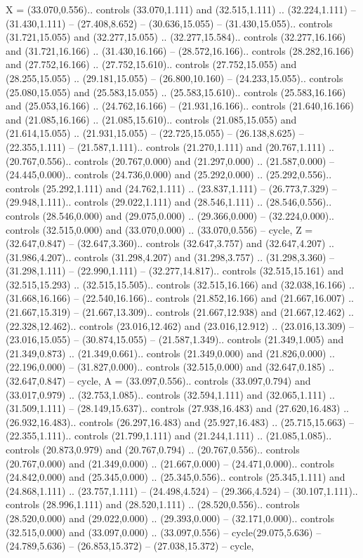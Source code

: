 {X} = {(33.070,0.556).. controls (33.070,1.111) and (32.515,1.111) .. (32.224,1.111) -- (31.430,1.111) -- (27.408,8.652) -- (30.636,15.055) -- (31.430,15.055).. controls (31.721,15.055) and (32.277,15.055) .. (32.277,15.584).. controls (32.277,16.166) and (31.721,16.166) .. (31.430,16.166) -- (28.572,16.166).. controls (28.282,16.166) and (27.752,16.166) .. (27.752,15.610).. controls (27.752,15.055) and (28.255,15.055) .. (29.181,15.055) -- (26.800,10.160) -- (24.233,15.055).. controls (25.080,15.055) and (25.583,15.055) .. (25.583,15.610).. controls (25.583,16.166) and (25.053,16.166) .. (24.762,16.166) -- (21.931,16.166).. controls (21.640,16.166) and (21.085,16.166) .. (21.085,15.610).. controls (21.085,15.055) and (21.614,15.055) .. (21.931,15.055) -- (22.725,15.055) -- (26.138,8.625) -- (22.355,1.111) -- (21.587,1.111).. controls (21.270,1.111) and (20.767,1.111) .. (20.767,0.556).. controls (20.767,0.000) and (21.297,0.000) .. (21.587,0.000) -- (24.445,0.000).. controls (24.736,0.000) and (25.292,0.000) .. (25.292,0.556).. controls (25.292,1.111) and (24.762,1.111) .. (23.837,1.111) -- (26.773,7.329) -- (29.948,1.111).. controls (29.022,1.111) and (28.546,1.111) .. (28.546,0.556).. controls (28.546,0.000) and (29.075,0.000) .. (29.366,0.000) -- (32.224,0.000).. controls (32.515,0.000) and (33.070,0.000) .. (33.070,0.556) -- cycle},
{Z} = {(32.647,0.847) -- (32.647,3.360).. controls (32.647,3.757) and (32.647,4.207) .. (31.986,4.207).. controls (31.298,4.207) and (31.298,3.757) .. (31.298,3.360) -- (31.298,1.111) -- (22.990,1.111) -- (32.277,14.817).. controls (32.515,15.161) and (32.515,15.293) .. (32.515,15.505).. controls (32.515,16.166) and (32.038,16.166) .. (31.668,16.166) -- (22.540,16.166).. controls (21.852,16.166) and (21.667,16.007) .. (21.667,15.319) -- (21.667,13.309).. controls (21.667,12.938) and (21.667,12.462) .. (22.328,12.462).. controls (23.016,12.462) and (23.016,12.912) .. (23.016,13.309) -- (23.016,15.055) -- (30.874,15.055) -- (21.587,1.349).. controls (21.349,1.005) and (21.349,0.873) .. (21.349,0.661).. controls (21.349,0.000) and (21.826,0.000) .. (22.196,0.000) -- (31.827,0.000).. controls (32.515,0.000) and (32.647,0.185) .. (32.647,0.847) -- cycle},
{A} = {(33.097,0.556).. controls (33.097,0.794) and (33.017,0.979) .. (32.753,1.085).. controls (32.594,1.111) and (32.065,1.111) .. (31.509,1.111) -- (28.149,15.637).. controls (27.938,16.483) and (27.620,16.483) .. (26.932,16.483).. controls (26.297,16.483) and (25.927,16.483) .. (25.715,15.663) -- (22.355,1.111).. controls (21.799,1.111) and (21.244,1.111) .. (21.085,1.085).. controls (20.873,0.979) and (20.767,0.794) .. (20.767,0.556).. controls (20.767,0.000) and (21.349,0.000) .. (21.667,0.000) -- (24.471,0.000).. controls (24.842,0.000) and (25.345,0.000) .. (25.345,0.556).. controls (25.345,1.111) and (24.868,1.111) .. (23.757,1.111) -- (24.498,4.524) -- (29.366,4.524) -- (30.107,1.111).. controls (28.996,1.111) and (28.520,1.111) .. (28.520,0.556).. controls (28.520,0.000) and (29.022,0.000) .. (29.393,0.000) -- (32.171,0.000).. controls (32.515,0.000) and (33.097,0.000) .. (33.097,0.556) -- cycle(29.075,5.636) -- (24.789,5.636) -- (26.853,15.372) -- (27.038,15.372) -- cycle},

